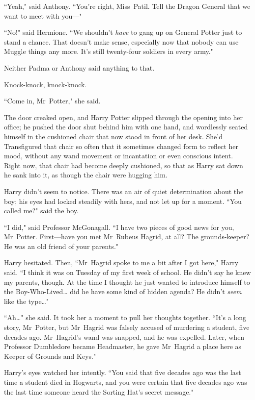 ``Yeah," said Anthony. ``You're right, Miss~Patil. Tell the Dragon General that we want to meet with you—"

``No!" said Hermione. ``We shouldn't \emph{have} to gang up on General Potter just to stand a chance. That doesn't make sense, especially now that nobody can use Muggle things any more. It's still twenty-four soldiers in every army."

Neither Padma or Anthony said anything to that.

\later

Knock-knock, knock-knock.

``Come in, Mr~Potter," she said.

The door creaked open, and Harry Potter slipped through the opening into her office; he pushed the door shut behind him with one hand, and wordlessly seated himself in the cushioned chair that now stood in front of her desk. She'd Transfigured that chair so often that it sometimes changed form to reflect her mood, without any wand movement or incantation or even conscious intent. Right now, that chair had become deeply cushioned, so that as Harry sat down he sank into it, as though the chair were hugging him.

Harry didn't seem to notice. There was an air of quiet determination about the boy; his eyes had locked steadily with hers, and not let up for a moment. ``You called me?" said the boy.

``I did," said Professor McGonagall. ``I have two pieces of good news for you, Mr~Potter. First—have you met Mr~Rubeus Hagrid, at all? The grounds-keeper? He was an old friend of your parents."

Harry hesitated. Then, ``Mr~Hagrid spoke to me a bit after I got here," Harry said. ``I think it was on Tuesday of my first week of school. He didn't say he knew my parents, though. At the time I thought he just wanted to introduce himself to the Boy-Who-Lived{\ldots} did he have some kind of hidden agenda? He didn't \emph{seem} like the type{\ldots}"

``Ah{\ldots}" she said. It took her a moment to pull her thoughts together. ``It's a long story, Mr~Potter, but Mr~Hagrid was falsely accused of murdering a student, five decades ago. Mr~Hagrid's wand was snapped, and he was expelled. Later, when Professor Dumbledore became Headmaster, he gave Mr~Hagrid a place here as Keeper of Grounds and Keys."

Harry's eyes watched her intently. ``You said that five decades ago was the last time a student died in Hogwarts, and you were certain that five decades ago was the last time someone heard the Sorting Hat's secret message."

